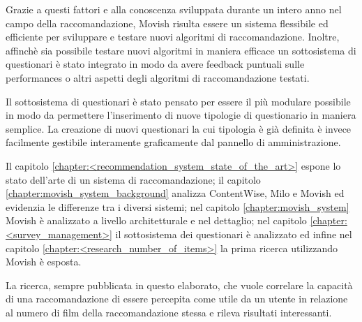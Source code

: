 Grazie a questi fattori e alla conoscenza sviluppata durante un intero anno nel campo della raccomandazione, Movish risulta essere un sistema flessibile ed efficiente per sviluppare e testare nuovi algoritmi di raccomandazione. Inoltre, affinch\`e sia possibile testare nuovi algoritmi in maniera efficace un sottosistema di questionari \`e stato integrato in modo da avere feedback puntuali sulle performances o altri aspetti degli algoritmi di raccomandazione testati.

Il sottosistema di questionari \`e stato pensato per essere il pi\`u modulare possibile in modo da permettere l'inserimento di nuove tipologie di questionario in maniera semplice. La creazione di nuovi questionari la cui tipologia \`e gi\`a definita \`e invece facilmente gestibile interamente graficamente dal pannello di amministrazione.

Il capitolo \ref{chapter:<recommendation_system_state_of_the_art>} espone lo stato dell'arte di un sistema di raccomandazione; il capitolo \ref{chapter:movish_system_background} analizza ContentWise, Milo e Movish ed evidenzia le differenze tra i diversi sistemi; nel capitolo \ref{chapter:movish_system} Movish \`e analizzato a livello architetturale e nel dettaglio; nel capitolo \ref{chapter:<survey_management>} il sottosistema dei questionari \`e analizzato ed infine nel capitolo \ref{chapter:<research_number_of_items>} la prima ricerca utilizzando Movish \`e esposta. 
 
La ricerca, sempre pubblicata in questo elaborato, che vuole correlare la capacit\`a di una raccomandazione di essere percepita come utile da un utente in relazione al numero di film della raccomandazione stessa e rileva risultati interessanti.

\acresetall